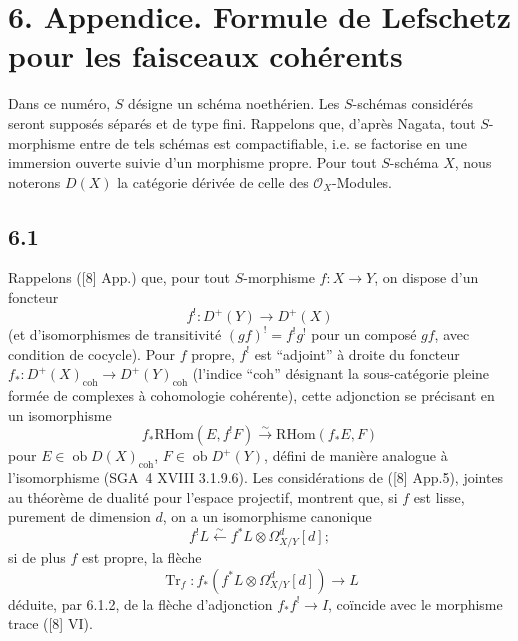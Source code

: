 \documentclass[11pt]{article}
\providecommand{\cO}{\mathcal{O}}
\providecommand{\RHom}{\mathrm{RHom}}
\providecommand{\RHom}{\mathrm{RHom}}
\begin{document}
\section*{6. Appendice. Formule de Lefschetz pour les faisceaux cohérents}

Dans ce numéro, $S$ désigne un schéma noethérien. Les $S$-schémas considérés seront supposés séparés et de type fini. Rappelons que, d'après Nagata, tout $S$-morphisme entre de tels schémas est compactifiable, i.e. se factorise en une immersion ouverte suivie d'un morphisme propre. Pour tout $S$-schéma $X$, nous noterons $D(X)$ la catégorie dérivée de celle des $\cO_X$-Modules.

\subsection*{6.1}
Rappelons ([8] App.) que, pour tout $S$-morphisme $f:X\to Y$, on dispose d'un foncteur
\[
f^!:D^+(Y)\longrightarrow D^+(X)
\]
(et d'isomorphismes de transitivité $(gf)^! = f^!g^!$ pour un composé $gf$, avec condition de cocycle). Pour $f$ propre, $f^!$ est ``adjoint'' à droite du foncteur $f_*:D^+(X)_{\mathrm{coh}}\to D^+(Y)_{\mathrm{coh}}$ (l'indice ``coh'' désignant la sous-catégorie pleine formée de complexes à cohomologie cohérente), cette adjonction se précisant en un isomorphisme
\begin{equation}
\tag{6.1.1}
f_*\RHom(E,f^!F)\xrightarrow{\sim}\RHom(f_*E,F)
\end{equation}
pour $E\in\operatorname{ob}D(X)_{\mathrm{coh}}$, $F\in\operatorname{ob}D^+(Y)$, défini de manière analogue à l'isomorphisme (SGA~4 XVIII 3.1.9.6). Les considérations de ([8] App.5), jointes au théorème de dualité pour l'espace projectif, montrent que, si $f$ est lisse, purement de dimension $d$, on a un isomorphisme canonique
\begin{equation}
\tag{6.1.2}
f^!L\xleftarrow{\sim} f^*L\otimes\Omega^d_{X/Y}[d];
\end{equation}
si de plus $f$ est propre, la flèche
\begin{equation}
\tag{6.1.3}
\operatorname{Tr}_f:f_*(f^*L\otimes\Omega^d_{X/Y}[d])\longrightarrow L
\end{equation}
déduite, par 6.1.2, de la flèche d'adjonction $f_*f^!\to I$, coïncide avec le morphisme trace ([8] VI).
\end{document}
